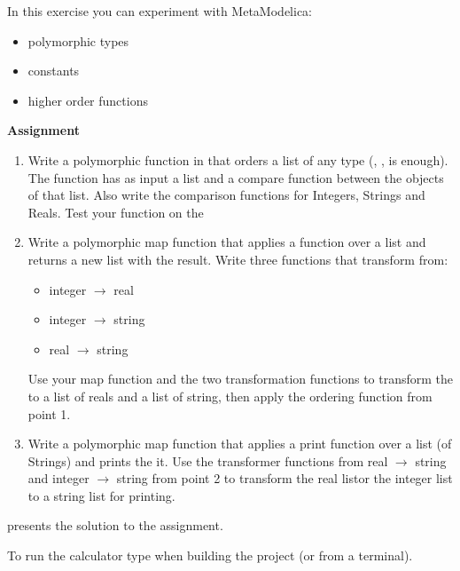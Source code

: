 In this exercise you can experiment with MetaModelica:
\begin{itemize}
\item polymorphic types
\item constants
\item higher order functions
\end{itemize}

{\bf Assignment}

\begin{enumerate}
\item Write a polymorphic function in  that orders a list of any type 
  (, ,  is enough).
   The function has as input a list and a compare function between the objects of that list. 
   Also write the comparison functions for Integers, Strings and Reals.
   Test your function on the 
\item Write a polymorphic map function that applies a 
   function over a list and returns a new list with the result.
   Write three functions that transform from:
   \begin{itemize}
   \item integer $\rightarrow$ real 
   \item integer $\rightarrow$ string
   \item real $\rightarrow$ string 
   \end{itemize}
   Use your map function and the two transformation functions to transform the 
    to a list of reals and a list of string, then apply the
   ordering function from point 1.
\item Write a polymorphic map function that applies a 
   print function over a list (of Strings) and prints the it.
   Use the transformer functions from real $\rightarrow$ string and integer $\rightarrow$ string 
   from point 2 to transform the real listor the integer list to a 
   string list for printing.
\end{enumerate}
   
 presents the solution to the assignment.

To run the calculator type  when building the project (or  from a terminal).


